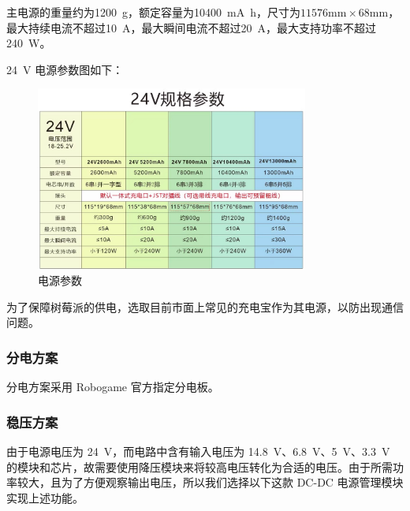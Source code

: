 \documentclass[10pt]{ctexart}
\begin{document}

主电源的重量约为\SI{1200}{\gram}，额定容量为\SI{10400}{\milli\ampere\hour}，尺寸为$11576\si{\milli\meter}\times 68\si{\milli\meter}$，最大持续电流不超过\SI{10}{\ampere}，最大瞬间电流不超过\SI{20}{\ampere}，最大支持功率不超过\SI{240}{\watt}。

\SI{24}{\volt} 电源参数图如下：

\begin{figure}[H]
    \centering
    \includegraphics[width = 0.8\textwidth]{source/source_parameter.jpg}
    \caption{电源参数}
    \label{fig:source_parameter}
\end{figure}


为了保障树莓派的供电，选取目前市面上常见的充电宝作为其电源，以防出现通信问题。
\subsubsection{分电方案}
分电方案采用 Robogame 官方指定分电板。
\subsubsection{稳压方案}
由于电源电压为 \SI{24}{\volt}，而电路中含有输入电压为
\SI{14.8}{\volt}、\SI{6.8}{\volt}、\SI{5}{\volt}、\SI{3.3}{\volt} 的模块和芯片，故需要使用降压模块来将较高电压转化为合适的电压。由于所需功率较大，且为了方便观察输出电压，所以我们选择以下这款 DC-DC 电源管理模块实现上述功能。
\end{document}
